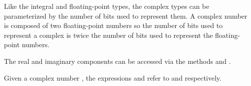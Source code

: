 Like the integral and floating-point types, the complex types can be
parameterized by the number of bits used to represent them.  A complex
number is composed of two floating-point numbers so the number of bits
used to represent a complex is twice the number of bits used to
represent the floating-point numbers.

The real and imaginary components can be accessed via the methods
 and .

\begin{example}
Given a complex number , the expressions
 and  refer to  and 
respectively.
\end{example}
